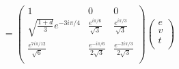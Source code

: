 \documentclass[12pt,a4paper]{article}
\begin{document}
\begin{align}
= \left( \begin{matrix}
1 & 0 & 0 \\
\sqrt{\frac{1+d}{3}} e^{-3i \pi /4} & \frac{e^{i \pi /6}}{\sqrt{3}} & \frac{e^{i \pi /3}}{\sqrt{3}} \\
\frac{e^{7 i \pi /12}}{\sqrt{6}} & \frac{e^{- i \pi / 6}}{2 \sqrt{3}} & \frac{e^{-2 i \pi /3}}{2 \sqrt{3}}\\
\end{matrix} \right)
\left( \begin{matrix}
e\\
v\\
t\\
\end{matrix} \right) \\
\end{align}
\end{document}
